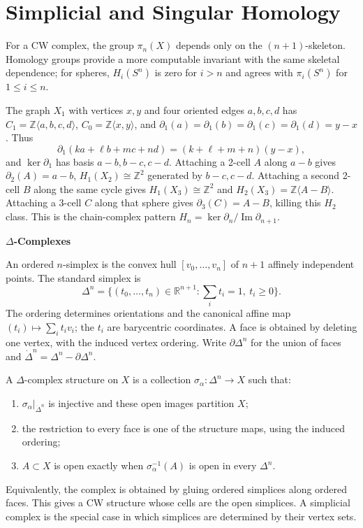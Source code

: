 \section{Simplicial and Singular Homology}

For a CW complex, the group $\pi_n(X)$ depends only on the $(n+1)$-skeleton.  Homology groups provide a more computable invariant with the same skeletal dependence; for spheres, $H_i(S^n)$ is zero for $i>n$ and agrees with $\pi_i(S^n)$ for $1\leq i\leq n$.

The graph $X_1$ with vertices $x,y$ and four oriented edges $a,b,c,d$ has $C_1=\mathbb{Z}\langle a,b,c,d\rangle$, $C_0=\mathbb{Z}\langle x,y\rangle$, and $\partial_1(a)=\partial_1(b)=\partial_1(c)=\partial_1(d)=y-x$.  Thus
\[
\partial_1(ka+\ell b+mc+nd)=(k+\ell+m+n)(y-x),
\]
and $\ker\partial_1$ has basis $a-b,b-c,c-d$.  Attaching a 2-cell $A$ along $a-b$ gives $\partial_2(A)=a-b$, $H_1(X_2)\cong\mathbb{Z}^2$ generated by $b-c,c-d$.  Attaching a second 2-cell $B$ along the same cycle gives $H_1(X_3)\cong\mathbb{Z}^2$ and $H_2(X_3)=\mathbb{Z}\langle A-B\rangle$.  Attaching a 3-cell $C$ along that sphere gives $\partial_3(C)=A-B$, killing this $H_2$ class.  This is the chain-complex pattern $H_n=\ker\partial_n/\operatorname{Im}\partial_{n+1}$.

\textbf{$\Delta$-Complexes}

An ordered $n$-simplex is the convex hull $[v_0,\ldots,v_n]$ of $n+1$ affinely independent points.  The standard simplex is
\[
\Delta^n=\{(t_0,\ldots,t_n)\in\mathbb{R}^{n+1}:\sum_i t_i=1,\ t_i\geq0\}.
\]
The ordering determines orientations and the canonical affine map $(t_i)\mapsto\sum_i t_i v_i$; the $t_i$ are barycentric coordinates.  A face is obtained by deleting one vertex, with the induced vertex ordering.  Write $\partial\Delta^n$ for the union of faces and $\dot\Delta^n=\Delta^n-\partial\Delta^n$.

A $\Delta$-complex structure on $X$ is a collection $\sigma_\alpha:\Delta^n\to X$ such that:
\begin{enumerate}
\item $\sigma_\alpha|_{\dot\Delta^n}$ is injective and these open images partition $X$;
\item the restriction to every face is one of the structure maps, using the induced ordering;
\item $A\subset X$ is open exactly when $\sigma_\alpha^{-1}(A)$ is open in every $\Delta^n$.
\end{enumerate}
Equivalently, the complex is obtained by gluing ordered simplices along ordered faces.  This gives a CW structure whose cells are the open simplices.  A simplicial complex is the special case in which simplices are determined by their vertex sets.


